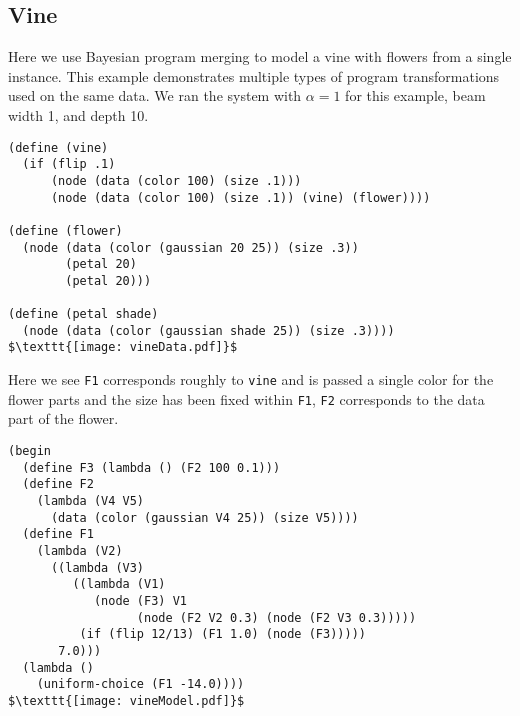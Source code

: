 \documentclass[a4paper,10pt]{article}
\begin{document}
\subsection{Vine}
Here we use Bayesian program merging to model a vine with flowers from a single instance.  This example demonstrates multiple types of program transformations used on the same data.  We ran the system with $\alpha=1$ for this example, beam width 1, and depth 10.
\begin{lstlisting}[mathescape=true]
(define (vine)
  (if (flip .1)
      (node (data (color 100) (size .1)))
      (node (data (color 100) (size .1)) (vine) (flower))))

(define (flower)
  (node (data (color (gaussian 20 25)) (size .3))
        (petal 20)
        (petal 20)))

(define (petal shade)
  (node (data (color (gaussian shade 25)) (size .3))))
$\texttt{[image: vineData.pdf]}$
\end{lstlisting}
Here we see \texttt{F1} corresponds roughly to \texttt{vine} and is passed a single color for the flower parts and the size has been fixed within \texttt{F1}, \texttt{F2} corresponds to the data part of the flower.
\begin{lstlisting}[mathescape=true]
(begin
  (define F3 (lambda () (F2 100 0.1)))
  (define F2
    (lambda (V4 V5)
      (data (color (gaussian V4 25)) (size V5))))
  (define F1
    (lambda (V2)
      ((lambda (V3)
         ((lambda (V1)
            (node (F3) V1
                  (node (F2 V2 0.3) (node (F2 V3 0.3)))))
          (if (flip 12/13) (F1 1.0) (node (F3)))))
       7.0)))
  (lambda ()
    (uniform-choice (F1 -14.0))))
$\texttt{[image: vineModel.pdf]}$
\end{lstlisting}
\end{document}

